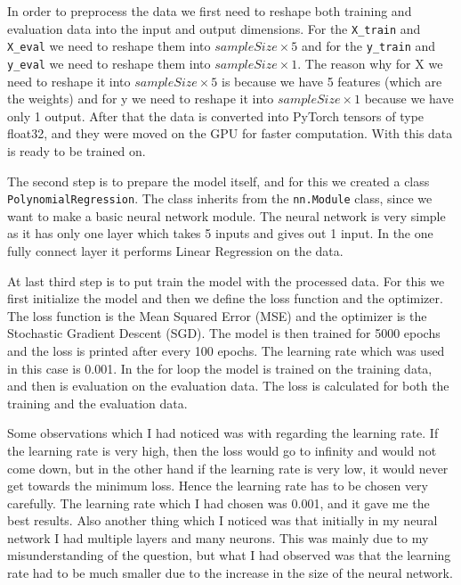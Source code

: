 \documentclass[a4paper]{article}
\begin{document}
\begin{enumerate}
	      In order to preprocess the data we first need to reshape both training and evaluation data into the input and output dimensions. For the \texttt{X\_train} and \texttt{X\_eval} we need to reshape them into $ sampleSize \times 5 $ and for the \texttt{y\_train} and \texttt{y\_eval} we need to reshape them into $ sampleSize \times 1 $. The reason why for X we need to reshape it into $ sampleSize \times 5 $ is because we have 5 features (which are the weights) and for y we need to reshape it into $ sampleSize \times 1 $ because we have only 1 output. After that the data is converted into PyTorch tensors of type float32, and they were moved on the GPU for faster computation. With this data is ready to be trained on.

	      The second step is to prepare the model itself, and for this we created a class \texttt{PolynomialRegression}. The class inherits from the \texttt{nn.Module} class, since we want to make a basic neural network module. The neural network is very simple as it has only one layer which takes 5 inputs and gives out 1 input. In the one fully connect layer it performs Linear Regression on the data.

	      At last third step is to put train the model with the processed data. For this we first initialize the model and then we define the loss function and the optimizer. The loss function is the Mean Squared Error (MSE) and the optimizer is the Stochastic Gradient Descent (SGD). The model is then trained for 5000 epochs and the loss is printed after every 100 epochs. The learning rate which was used in this case is 0.001. In the for loop the model is trained on the training data, and then is evaluation on the evaluation data. The loss is calculated for both the training and the evaluation data.

	      Some observations which I had noticed was with regarding the learning rate. If the learning rate is very high, then the loss would go to infinity and would not come down, but in the other hand if the learning rate is very low, it would never get towards the minimum loss. Hence the learning rate has to be chosen very carefully. The learning rate which I had chosen was 0.001, and it gave me the best results. Also another thing which I noticed was that initially in my neural network I had multiple layers and many neurons. This was mainly due to my misunderstanding of the question, but what I had observed was that the learning rate had to be much smaller due to the increase in the size of the neural network. 


\end{enumerate}
\end{document}
